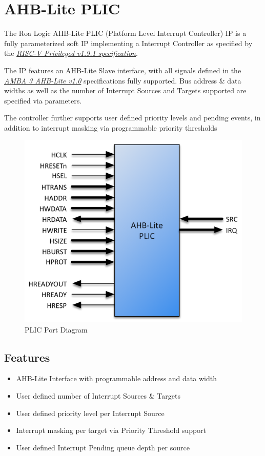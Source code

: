 \section{AHB-Lite PLIC}

The Roa Logic AHB-Lite PLIC (Platform Level Interrupt Controller) IP is a fully parameterized soft IP implementing a Interrupt Controller as specified by the \emph{\href{https://people.eecs.berkeley.edu/\%7Ekrste/papers/riscv-privileged-v1.9.1.pdf}{RISC-V Privileged v1.9.1 specification}}.

The IP features an AHB-Lite Slave interface, with all signals defined in the \emph{\href{https://www.arm.com/products/system-ip/amba-specifications}{AMBA 3 AHB-Lite v1.0}} specifications fully supported. Bus address \& data widths as well as the number of Interrupt Sources and Targets supported are specified via parameters.

The controller further supports user defined priority levels and pending events, in addition to interrupt masking via programmable priority thresholds

\begin{figure}[h]
  \centering
  \includegraphics{../assets/graphics/AHB-Lite_PLIC_Port_Diagram.png}
  \caption{PLIC Port Diagram}
\end{figure}

\subsection{Features}

\begin{itemize}
\item
  AHB-Lite Interface with programmable address and data width
\item
  User defined number of Interrupt Sources \& Targets
\item
  User defined priority level per Interrupt Source
\item
  Interrupt masking per target via Priority Threshold support
\item
  User defined Interrupt Pending queue depth per source
\end{itemize}